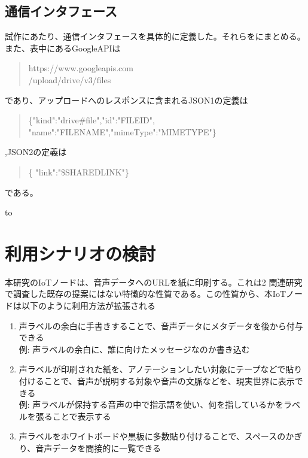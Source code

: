 \documentclass[submit,techrep,noauthor]{ipsj}
\begin{document}
\subsection{通信インタフェース}
試作にあたり、通信インタフェースを具体的に定義した。それらをにまとめる。また、表中にあるGoogleAPIは
\begin{quote}
    https://www.googleapis.com\\/upload/drive/v3/files
\end{quote}であり、アップロードへのレスポンスに含まれるJSON1の定義は\begin{quote}
    \{"kind":"drive\#file","id":"FILEID", "name":"FILENAME","mimeType":"MIMETYPE"\}
\end{quote},JSON2の定義は\begin{quote}
    \{ "link":"\$SHAREDLINK"\}
\end{quote}である。

\begin{table}[tb] 
\caption{試作物の通信インタフェース} 
\label{tab:proto-communication}
\hbox to
\end{table}

\section{利用シナリオの検討}
本研究のIoTノードは、音声データへのURLを紙に印刷する。これは2 関連研究で調査した既存の提案にはない特徴的な性質である。この性質から、本IoTノードは以下のように利用方法が拡張される
\begin{enumerate}
    \item 声ラベルの余白に手書きすることで、音声データにメタデータを後から付与できる\\例: 声ラベルの余白に、誰に向けたメッセージなのか書き込む
    \item 声ラベルが印刷された紙を、アノテーションしたい対象にテープなどで貼り付けることで、音声が説明する対象や音声の文脈などを、現実世界に表示できる \\例: 声ラベルが保持する音声の中で指示語を使い、何を指しているかをラベルを張ることで表示する
    \item 声ラベルをホワイトボードや黒板に多数貼り付けることで、スペースのかぎり、音声データを間接的に一覧できる
\end{enumerate}
\end{document}
